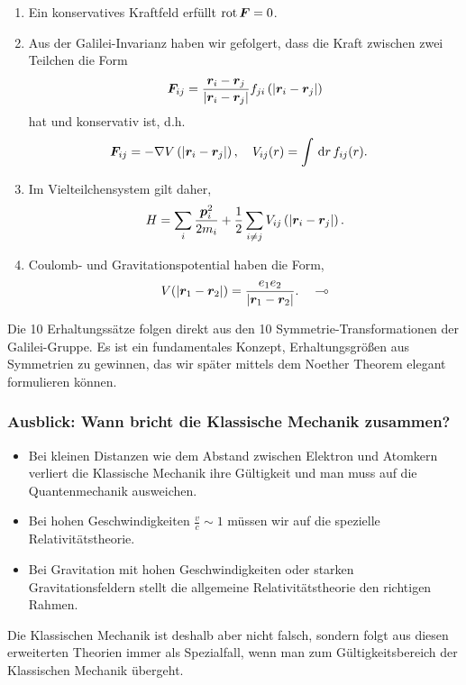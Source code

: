 \begin{bemn}[Bemerkungen.]
\begin{enumerate}[label=\arabic{*}.)]
\item 
Ein konservatives Kraftfeld erfüllt $\operatorname{rot} \bm{F} = 0$.
\item
Aus der Galilei-Invarianz haben wir gefolgert, dass die Kraft zwischen zwei
Teilchen die Form
\begin{align*}
\bm{F}_{ij} = \frac{\bm{r}_i -
\bm{r}_j}{\left|\bm{r}_i-\bm{r}_j\right|}f_{ji}\left(\left|\bm{r}_i -
\bm{r}_j\right|\right)
\end{align*}
hat und konservativ ist, d.h.
\begin{align*}
\bm{F}_{ij} &= -\nabla V\left(\left|\bm{r}_i -
\bm{r}_j\right|\right),\quad V_{ij}(r) = \int\,\mathrm{d} r\, f_{ij}(r).
\end{align*}
\item Im Vielteilchensystem gilt daher,
\begin{align*}
H = \sum_i \frac{\bm{p}_i^2}{2m_i} + \frac{1}{2}\sum_{i\neq j}
V_{ij}\left(\left|\bm{r}_i - \bm{r}_j\right|\right).
\end{align*}
\item Coulomb- und Gravitationspotential haben die Form,
\begin{align*}
V(\left|\bm{r}_1-\bm{r}_2\right|) = \frac{e_1e_2}{\left|\bm{r}_1-\bm{r}_2\right|}.\quad\multimap
\end{align*}
\end{enumerate}
\end{bemn}

Die 10 Erhaltungssätze folgen direkt aus den 10 Symmetrie-Transformationen der
Galilei-Gruppe. Es ist ein fundamentales Konzept, Erhaltungsgrößen aus
Symmetrien zu gewinnen, das wir später mittels dem Noether Theorem elegant
formulieren können.

\subsubsection{Ausblick: Wann bricht die Klassische Mechanik zusammen?}
\begin{itemize}[label=]
  \item Bei kleinen Distanzen wie dem Abstand
  zwischen Elektron und Atomkern verliert die Klassische Mechanik ihre
  Gültigkeit und man muss auf die Quantenmechanik ausweichen.
  \item Bei hohen Geschwindigkeiten $\frac{v}{c} \sim 1$ müssen wir auf die
  spezielle Relativitätstheorie.
  \item Bei Gravitation mit hohen Geschwindigkeiten oder starken
  Gravitationsfeldern stellt die allgemeine Relativitätstheorie den richtigen
  Rahmen.
\end{itemize}
Die Klassischen Mechanik ist deshalb aber nicht falsch, sondern folgt aus diesen
erweiterten Theorien immer als Spezialfall, wenn man zum Gültigkeitsbereich der
Klassischen Mechanik übergeht.